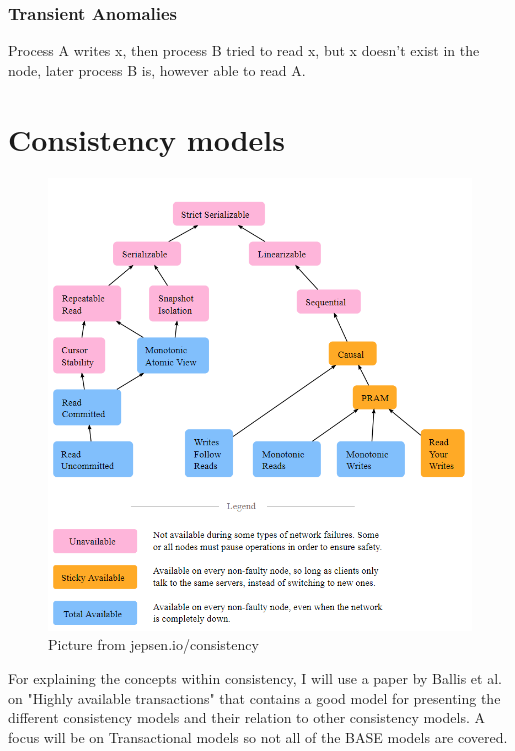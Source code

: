 \documentclass[a4paper,10pt,titlepage]{report}
\begin{document}
    \subsubsection{Transient Anomalies}
    Process A writes x, then process B tried to read x, but x doesn't exist in the node, later process B is, however able to read A.

    \newpage


    \section{Consistency models}


    \begin{figure}
        \centering
        \includegraphics[scale=0.4]{images/consistency models.PNG}
        \caption{Picture from jepsen.io/consistency}
        \label{fig:jepsenioconsistency}
    \end{figure}

    For explaining the concepts within consistency, I will use a paper by Ballis et al. on "Highly available transactions"\cite{HighlyAvailableTransactionsVirtuesandLimitations} that contains a good model for presenting the different consistency models and their relation to other consistency models. A focus will be on Transactional models so not all of the BASE models are covered.\\
\end{document}
